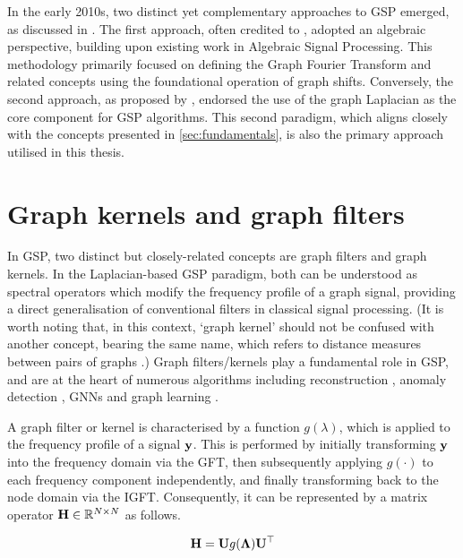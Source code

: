 In the early 2010s, two distinct yet complementary approaches to GSP emerged, as discussed in \cite{Leus2023}. The first approach, often credited to \cite{Sandryhaila2013, Sandryhaila2013b}, adopted an algebraic perspective, building upon existing work in Algebraic Signal Processing. This methodology primarily focused on defining the Graph Fourier Transform and related concepts using the foundational operation of graph shifts. Conversely, the second approach, as proposed by  \cite{Hammond2011, Shuman2013}, endorsed the use of the graph Laplacian as the core component for GSP algorithms. This second paradigm, which aligns closely with the concepts presented in \cref{sec:fundamentals}, is also the primary approach utilised in this thesis.


\section{Graph kernels and graph filters}

\label{sec:graph_kernels}

In GSP, two distinct but closely-related concepts are graph filters and graph kernels. In the Laplacian-based GSP paradigm, both can be understood as spectral operators which modify the frequency profile of a graph signal, providing a direct generalisation of conventional filters in classical signal processing. (It is worth noting that, in this context, `graph kernel' should not be confused with another concept, bearing the same name, which refers to distance measures between pairs of graphs \citep{Kriege2020}.) Graph filters/kernels play a fundamental role in GSP, and are at the heart of numerous algorithms including reconstruction \citep{Romero2017b}, anomaly detection \citep{Xiao2021}, GNNs \citep{Gama2020} and graph learning \citep{Mateos2019}. 

A graph filter or kernel is characterised by a function $g(\lambda)$, which is applied to the frequency profile of a signal $\mathbf{y}$. This is performed by initially transforming $\mathbf{y}$ into the frequency domain via the GFT, then subsequently applying $g(\cdot)$ to each frequency component independently, and finally transforming back to the node domain via the IGFT. Consequently, it can be represented by a matrix operator $\mathbf{H} \in \mathbb{R}^{N \times N}$ as follows.

\begin{equation}
    \mathbf{H}  = \mathbf{U} g(\mathbf{\Lambda}) \mathbf{U}^\top 
\end{equation}

